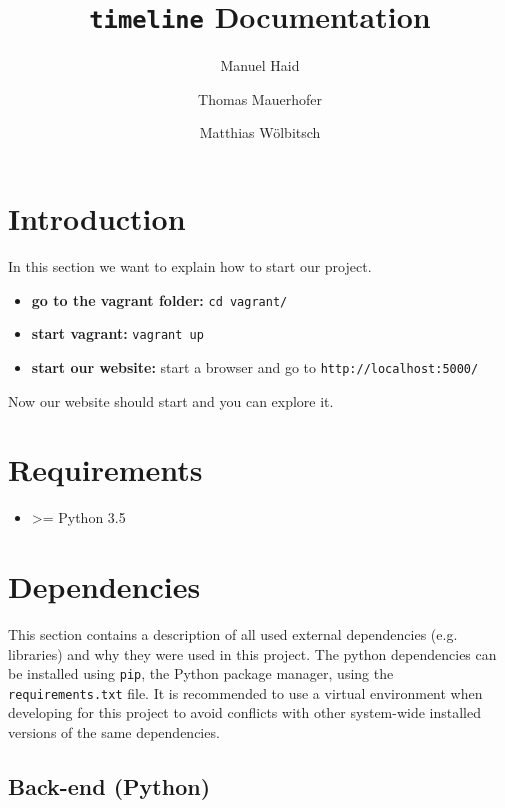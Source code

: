 \documentclass[11pt, a4paper]{article}
\author{Manuel Haid \and Thomas Mauerhofer \and Matthias Wölbitsch}
\title{\texttt{timeline} Documentation}
\begin{document}
\maketitle
\tableofcontents

\section{Introduction} \label{sec:intoduction}

In this section we want to explain how to start our project.

\begin{itemize}
\item
\textbf{go to the vagrant folder:} \texttt{cd vagrant/}
\item
\textbf{start vagrant:} \texttt{vagrant up}
\item
\textbf{start our website:} start a browser and go to \texttt{http://localhost:5000/}
\end{itemize}

Now our website should start and you can explore it.

\section{Requirements} \label{sec:requirments}

\begin{itemize}
 \item \textgreater= Python 3.5
\end{itemize}
 

\section{Dependencies}\label{sec:dependencies}

This section contains a description of all used external dependencies (e.g. libraries) and why they were used in this project.
The python dependencies can be installed using \texttt{pip}, the Python package manager, using the \texttt{requirements.txt} file. 
It is recommended to use a virtual environment when developing for this project to avoid conflicts with other system-wide installed versions of the same dependencies.


\subsection{Back-end (Python)}
\end{document}
